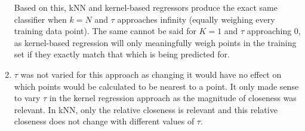 \documentclass[submit]{harvardml}
\begin{document}
\begin{enumerate}
Based on this, kNN and kernel-based regressors produce the exact same classifier when $k=N$ and 
$\tau$ approaches infinity (equally weighing every training data point). The same cannot be said
for $K=1$ and $\tau$ approaching 0, as kernel-based regression will only meaningfully weigh points 
in the training set if they exactly match that which is being predicted for.

\item 

$\tau$ was not varied for this approach as changing it would have no effect on which points
would be calculated to be nearest to a point. It only made sense to vary $\tau$ in the kernel
regression approach as the magnitude of closeness was relevant. In kNN, only the relative closeness
is relevant and this relative closeness does not change with different values of $\tau$.

\end{enumerate}


\newpage 

\end{document}

